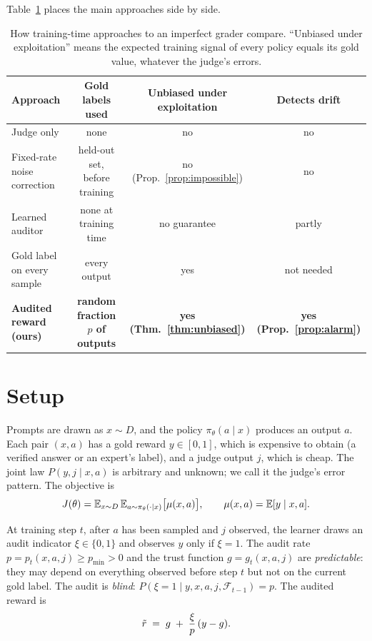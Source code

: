 Table~\ref{tab:compare} places the main approaches side by side.

\begin{table}[t]
\centering
\small
\caption{How training-time approaches to an imperfect grader compare. ``Unbiased under exploitation'' means the expected training signal of every policy equals its gold value, whatever the judge's errors.}
\label{tab:compare}
\begin{tabular}{@{}lccc@{}}
\toprule
Approach & Gold labels used & Unbiased under exploitation & Detects drift \\
\midrule
Judge only & none & no & no \\
Fixed-rate noise correction & held-out set, before training & no (Prop.~\ref{prop:impossible}) & no \\
Learned auditor & none at training time & no guarantee & partly \\
Gold label on every sample & every output & yes & not needed \\
\textbf{Audited reward (ours)} & \textbf{random fraction $p$ of outputs} & \textbf{yes (Thm.~\ref{thm:unbiased})} & \textbf{yes (Prop.~\ref{prop:alarm})} \\
\bottomrule
\end{tabular}
\end{table}

\section{Setup}
\label{sec:setup}

Prompts are drawn as $x\sim D$, and the policy $\pi_\theta(a\mid x)$ produces an output $a$. Each pair $(x,a)$ has a gold reward $y\in[0,1]$, which is expensive to obtain (a verified answer or an expert's label), and a judge output $j$, which is cheap. The joint law $P(y,j\mid x,a)$ is arbitrary and unknown; we call it the judge's error pattern. The objective is
\[
J(\theta)=\mathbb{E}_{x\sim D}\,\mathbb{E}_{a\sim\pi_\theta(\cdot\mid x)}\bigl[\mu(x,a)\bigr],\qquad \mu(x,a)=\mathbb{E}[y\mid x,a].
\]

\begin{definition}
At training step $t$, after $a$ has been sampled and $j$ observed, the learner draws an audit indicator $\xi\in\{0,1\}$ and observes $y$ only if $\xi=1$. The audit rate $p=p_t(x,a,j)\ge p_{\min}>0$ and the trust function $g=g_t(x,a,j)$ are \emph{predictable}: they may depend on everything observed before step $t$ but not on the current gold label. The audit is \emph{blind}: $P(\xi=1\mid y,x,a,j,\mathcal F_{t-1})=p$. The audited reward is
\begin{equation}
\tilde r \;=\; g \;+\; \frac{\xi}{p}\,(y-g).
\label{eq:audited}
\end{equation}
\end{definition}

